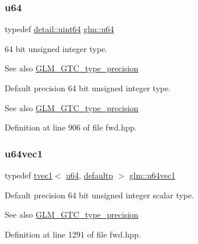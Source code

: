 \subsubsection{\texorpdfstring{u64}{u64}}
{\footnotesize\ttfamily typedef \mbox{\hyperlink{namespaceglm_1_1detail_adec4b19bf4982125e122db2fe03c5810}{detail\+::uint64}} \mbox{\hyperlink{group__gtc__type__precision_ga71cedd4972f9cb1a5e14dfe5ab83ecd7}{glm\+::u64}}}

64 bit unsigned integer type. \begin{DoxySeeAlso}{See also}
\mbox{\hyperlink{group__gtc__type__precision}{G\+L\+M\+\_\+\+G\+T\+C\+\_\+type\+\_\+precision}}
\end{DoxySeeAlso}
Default precision 64 bit unsigned integer type. \begin{DoxySeeAlso}{See also}
\mbox{\hyperlink{group__gtc__type__precision}{G\+L\+M\+\_\+\+G\+T\+C\+\_\+type\+\_\+precision}} 
\end{DoxySeeAlso}


Definition at line 906 of file fwd.\+hpp.

\mbox{\label{group__gtc__type__precision_gaf0a59fdb715cf4ddf0c4dabf0e2286a9}} 
\subsubsection{\texorpdfstring{u64vec1}{u64vec1}}
{\footnotesize\ttfamily typedef \mbox{\hyperlink{structglm_1_1tvec1}{tvec1}}$<$ \mbox{\hyperlink{group__gtc__type__precision_ga71cedd4972f9cb1a5e14dfe5ab83ecd7}{u64}}, \mbox{\hyperlink{namespaceglm_a0f04f086094c747d227af4425893f545a9d21ccd8b5a009ec7eb7677befc3bf51}{defaultp}} $>$ \mbox{\hyperlink{group__gtc__type__precision_gaf0a59fdb715cf4ddf0c4dabf0e2286a9}{glm\+::u64vec1}}}

Default precision 64 bit unsigned integer scalar type. \begin{DoxySeeAlso}{See also}
\mbox{\hyperlink{group__gtc__type__precision}{G\+L\+M\+\_\+\+G\+T\+C\+\_\+type\+\_\+precision}} 
\end{DoxySeeAlso}


Definition at line 1291 of file fwd.\+hpp.

\mbox{\label{group__gtc__type__precision_gaddd85665767e5d32aee8516f00c45f59}} 
